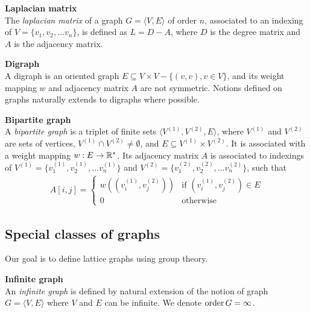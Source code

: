 \begin{definition}\textbf{Laplacian matrix}\\
The \emph{laplacian matrix} of a graph $G = \langle V,E \rangle$ of order $n$, associated to an indexing of $V = \{v_1, v_2, \ldots v_n\}$, is defined as $L = D - A$, where $D$ is the degree matrix and $A$ is the adjacency matrix.
\end{definition}

\begin{definition}\textbf{Digraph}\\
A digraph is an oriented graph \ie $E \subseteq V \times V - \{(v,v), v \in V\}$, and its weight mapping $w$ and adjacency matrix $A$ are not symmetric. Notions defined on graphs naturally extends to digraphs where possible.
\end{definition}

\begin{definition}\textbf{Bipartite graph}\\
A \emph{bipartite graph} is a triplet of finite sets $\langle V^{(1)}, V^{(2)}, E \rangle$, where $V^{(1)}$ and $V^{(2)}$ are sets of vertices, $V^{(1)} \cap V^{(2)} \neq \emptyset$, and $E \subseteq V^{(1)} \times V^{(2)}$. It is associated with a weight mapping $w: E \rightarrow \mathbb{R}^*$. Its adjacency matrix $A$ is associated to indexings of $V^{(1)} = \{v^{(1)}_1, v^{(1)}_2, \ldots v^{(1)}_n\}$ and $V^{(2)} = \{v^{(2)}_1, v^{(2)}_2, \ldots v^{(2)}_n\}$, such that
\begin{gather*}
A[i,j] =
 \begin{cases}
   w\left((v^{(1)}_i,v^{(2)}_j)\right) & \text{if } (v^{(1)}_i,v^{(2)}_j) \in E \\
   0 & \text{otherwise}
 \end{cases}
\end{gather*}
\end{definition}

\subsection{Special classes of graphs}

Our goal is to define lattice graphs using group theory.

\begin{definition}\textbf{Infinite graph}\\
An \emph{infinite graph} is defined by natural extension of the notion of graph $G=\langle V,E \rangle$ where $V$ and $E$ can be infinite. We denote $\operatorname{order}{G} = \infty$.
\end{definition}

